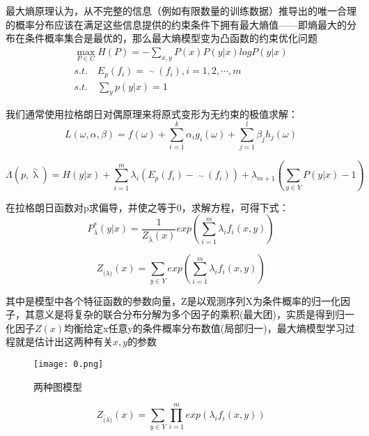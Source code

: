 \documentclass[bwprint]{cumcmthesis}
\begin{document}
最大熵原理认为，从不完整的信息（例如有限数量的训练数据）推导出的唯一合理的概率分布应该在满足这些信息提供的约束条件下拥有最大熵值——即熵最大的分布在条件概率集合是最优的，那么最大熵模型变为凸函数的约束优化问题 
\begin{gather}
	\mathop{max}\limits_{P \in C}H(P) = - \sum\limits_{x,y}P(x)P(y|x)logP(y|x) \nonumber \\
	s.t. \quad E_p(f_i) = \mathop{E_p}\limits^{\sim}(f_i),i=1,2,\cdots,m \\
	s.t. \quad \sum\limits_{y}p(y|x) = 1 \nonumber 
\end{gather}

我们通常使用拉格朗日对偶原理来将原式变形为无约束的极值求解： 
\begin{equation}
	L(\omega,\alpha,\beta) = f(\omega)+\sum\limits^{k}_{i=1}\alpha_i g_i(\omega)+\sum\limits^{l}_{j=1}\beta_j h_j(\omega)
\end{equation}

\begin{equation}
	\Lambda(p,\mathop{\lambda}\limits^{\sim}) = H(y|x)+\sum\limits_{i=1}^{m}\lambda_i(E_p(f_i)-\mathop{E_p}\limits^{\sim}(f_i)) + \lambda_{m+1}(\sum\limits_{y \in Y} P(y|x)-1)
\end{equation}

在拉格朗日函数对p求偏导，并使之等于0，求解方程，可得下式：
\begin{equation}
	P^*_{\bar{\lambda}}(y|x) = \frac{1}{Z_{\bar{\lambda}}(x)}exp\left( \sum\limits^{m}_{i=1}\lambda_i f_i(x,y) \right)
\end{equation}

\begin{equation}
	Z_{\bar(\lambda)}(x) = \sum\limits_{y \in Y}exp \left(\sum\limits^{m}_{i=1}\lambda_i f_i(x,y)\right)
\end{equation}

其中是模型中各个特征函数的参数向量，Z是以观测序列X为条件概率的归一化因子，其意义是将复杂的联合分布分解为多个因子的乘积(最大团)，实质是得到归一化因子$Z(x)$均衡给定x任意y的条件概率分布数值(局部归一)，最大熵模型学习过程就是估计出这两种有关$x,y$的参数 
\begin{figure}[!h]
\centering
\texttt{[image: 0.png]}
\caption{两种图模型}
\end{figure}

\begin{equation}
	Z_{\bar(\lambda)}(x) = \sum\limits_{y \in Y} \prod\limits^{m}_{i=1}exp(\lambda_i f_i(x,y))
\end{equation}
\end{document}
